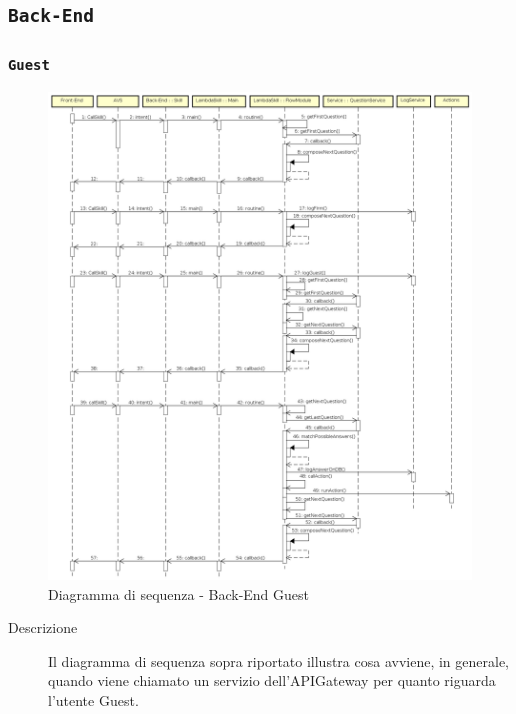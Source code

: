 \documentclass[../DefinizioneDiProdotto_v3.0.0.tex]{subfiles}
\begin{document}
\newpage
\subsection{\texttt{Back-End}}
\subsubsection{\texttt{Guest}}
\begin{figure}[!h]
	\centering
	\includegraphics[width=\textwidth]{DiagrammiSequenza/Back-End/DiagrammaSequenzaBackendGuest.png}
	\caption{Diagramma di sequenza - Back-End Guest }
\end{figure}
\begin{description}
	\item [Descrizione] Il diagramma di sequenza sopra riportato illustra cosa avviene, in generale, quando viene chiamato un servizio dell'APIGateway per quanto riguarda l'utente Guest.
\end{description}

\newpage
\end{document}
